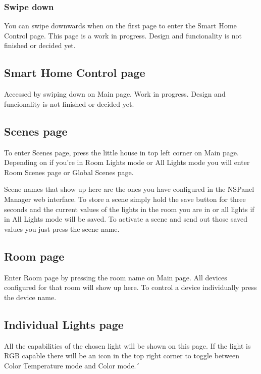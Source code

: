 \documentclass[10pt]{article}
\begin{document}
    \subsubsection{Swipe down}
    You can swipe downwards when on the first page to enter the Smart Home Control page.
    This page is a work in progress. Design and funcionality is not finished or decided yet.
    \subsection{Smart Home Control page}
    Accessed by swiping down on Main page. Work in progress. Design and funcionality is not finished or decided yet.  
    \subsection{Scenes page}
    To enter Scenes page, press the little house in top left corner on Main page. Depending on if you're in Room Lights mode or All Lights mode you will enter Room Scenes page or Global Scenes page.
    
    Scene names that show up here are the ones you have configured in the NSPanel Manager web interface. To store a scene simply hold the save button for three seconds and the current values of the lights in the room you are in or all lights if in All Lights mode will be saved. To activate a scene and send out those saved values you just press the scene name.
    \subsection{Room page}
	Enter Room page by pressing the room name on Main page. All devices configured for that room will show up here. To control a device individually press the device name. 
    \subsection{Individual Lights page}
    All the capabilities of the chosen light will be shown on this page. If the light is RGB capable there will be an icon in the top right corner to toggle between Color Temperature mode and Color mode.´

    \clearpage
\end{document}

